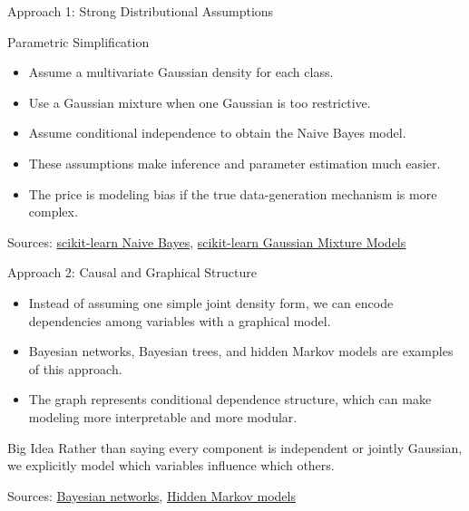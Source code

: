 \documentclass[10pt]{beamer}
\begin{document}
\begin{frame}{Approach 1: Strong Distributional Assumptions}
  \justifying
  \begin{conceptbox}{Parametric Simplification}
    \begin{itemize}
      \item Assume a multivariate Gaussian density for each class.
      \item Use a Gaussian mixture when one Gaussian is too restrictive.
      \item Assume conditional independence to obtain the Naive Bayes model.
    \end{itemize}
  \end{conceptbox}
  \vspace{0.4em}
  \begin{itemize}
    \item These assumptions make inference and parameter estimation much easier.
    \item The price is modeling bias if the true data-generation mechanism is more complex.
  \end{itemize}
  \vspace{0.3em}
  {\footnotesize Sources: \href{https://scikit-learn.org/stable/modules/naive_bayes.html}{scikit-learn Naive Bayes}, \href{https://scikit-learn.org/stable/modules/mixture.html}{scikit-learn Gaussian Mixture Models}}
\end{frame}

\begin{frame}{Approach 2: Causal and Graphical Structure}
  \justifying
  \begin{itemize}
    \item Instead of assuming one simple joint density form, we can encode dependencies among variables with a graphical model.
    \item Bayesian networks, Bayesian trees, and hidden Markov models are examples of this approach.
    \item The graph represents conditional dependence structure, which can make modeling more interpretable and more modular.
  \end{itemize}
  \begin{examplebox}{Big Idea}
    Rather than saying every component is independent or jointly Gaussian, we explicitly model which variables influence which others.
  \end{examplebox}
  \vspace{0.3em}
  {\footnotesize Sources: \href{https://en.wikipedia.org/wiki/Bayesian_network}{Bayesian networks}, \href{https://en.wikipedia.org/wiki/Hidden_Markov_model}{Hidden Markov models}}
\end{frame}
\end{document}
